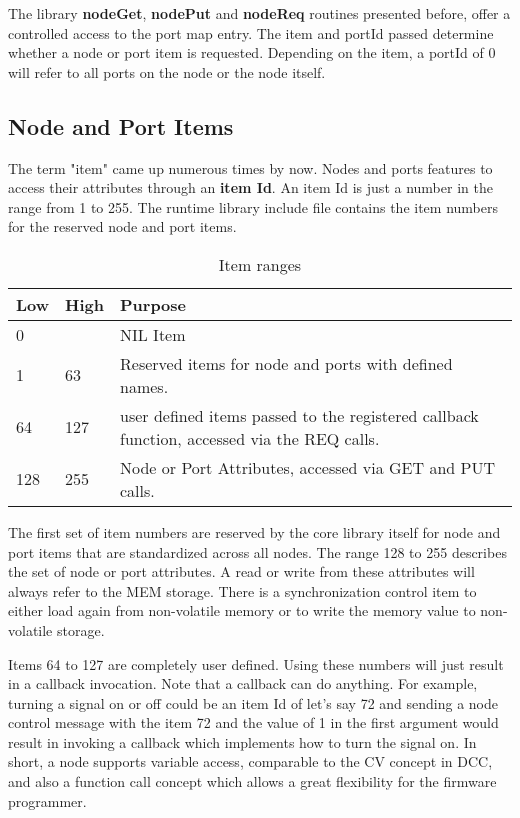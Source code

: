 The library \textbf{nodeGet}, \textbf{nodePut} and \textbf{nodeReq} routines presented before, offer a controlled access to the port map entry. The item and portId passed determine whether a node or port item is requested. Depending on the item, a portId of 0 will refer to all ports on the node or the node itself.

\subsection{Node and Port Items}

The term "item" came up numerous times by now. Nodes and ports features to access their attributes through an \textbf{item Id}. An item Id is just a number in the range from 1 to 255. The runtime library include file contains the item numbers for the reserved node and port items.

\begin{table}[!ht]
    \begin{center}
        \begin{tabular}{|l|l|p{}|}
            \toprule
            \textbf{Low} & \textbf{High} & \textbf{Purpose} \\
            \midrule
            0 & & NIL Item \\
            \midrule
            1 & 63 & Reserved items for node and ports with defined names. \\
            \midrule
            64 & 127 & user defined items passed to the registered callback function, accessed via the REQ calls. \\
            \midrule
            128 & 255 & Node or Port Attributes, accessed via GET and PUT calls. \\
            \bottomrule
        \end{tabular}
    \end{center}
    \caption{Item ranges}
\end{table}
\FloatBarrier

The first set of item numbers are reserved by the core library itself for node and port items that are standardized across all nodes. The range 128 to 255 describes the set of node or port attributes. A read or write from these attributes will always refer to the MEM storage. There is a synchronization control item to either load again from non-volatile memory or to write the memory value to non-volatile storage.

Items 64 to 127 are completely user defined. Using these numbers will just result in a callback invocation. Note that a callback can do anything. For example, turning a signal on or off could be an item Id of let's say 72 and sending a node control message with the item 72 and the value of 1 in the first argument would result in invoking a callback which implements how to turn the signal on. In short, a node supports variable access, comparable to the CV concept in DCC, and also a function call concept which allows a great flexibility for the firmware programmer.

